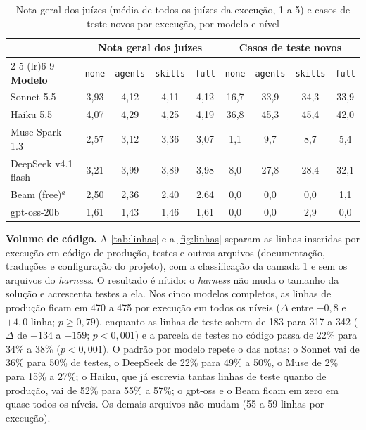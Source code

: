 \begin{table}[htb]
    \centering
    \ABNTEXfontereduzida
    \caption{Nota geral dos juízes (média de todos os juízes da execução, 1 a 5) e casos de teste novos por execução, por modelo e nível}
    \label{tab:qualidade-modelo}
    \begin{tabular}{lcccccccc}
        \toprule
        & \multicolumn{4}{c}{\textbf{Nota geral dos juízes}} & \multicolumn{4}{c}{\textbf{Casos de teste novos}} \\
        \cmidrule(lr){2-5} \cmidrule(lr){6-9}
        \textbf{Modelo} & \texttt{none} & \texttt{agents} & \texttt{skills} & \texttt{full} & \texttt{none} & \texttt{agents} & \texttt{skills} & \texttt{full} \\
        \midrule
        Sonnet 5.5 & 3,93 & 4,12 & 4,11 & 4,12 & 16,7 & 33,9 & 34,3 & 33,9 \\
        Haiku 5.5 & 4,07 & 4,29 & 4,25 & 4,19 & 36,8 & 45,3 & 45,4 & 42,0 \\
        Muse Spark 1.3 & 2,57 & 3,12 & 3,36 & 3,07 & 1,1 & 9,7 & 8,7 & 5,4 \\
        DeepSeek v4.1 flash & 3,21 & 3,99 & 3,89 & 3,98 & 8,0 & 27,8 & 28,4 & 32,1 \\
        Beam (free)$^{a}$ & 2,50 & 2,36 & 2,40 & 2,64 & 0,0 & 0,0 & 0,0 & 1,1 \\
        gpt-oss-20b & 1,61 & 1,43 & 1,46 & 1,61 & 0,0 & 0,0 & 2,9 & 0,0 \\
        \bottomrule
    \end{tabular}
\end{table}

\textbf{Volume de código.} A \autoref{tab:linhas} e a \autoref{fig:linhas}
separam as linhas inseridas por execução em código de produção, testes e outros
arquivos (documentação, traduções e configuração do projeto), com a
classificação da camada 1 e sem os arquivos do \textit{harness}. O resultado é
nítido: o \textit{harness} não muda o tamanho da solução e acrescenta testes a
ela. Nos cinco modelos completos, as linhas de produção ficam em 470 a 475 por
execução em todos os níveis ($\Delta$ entre $-0{,}8$ e $+4{,}0$ linha;
$p \ge 0{,}79$), enquanto as linhas de teste sobem de 183 para 317 a 342
($\Delta$ de $+134$ a $+159$; $p < 0{,}001$) e a parcela de testes no código
passa de 22\% para 34\% a 38\% ($p < 0{,}001$). O padrão por modelo repete o
das notas: o Sonnet vai de 36\% para 50\% de testes, o DeepSeek de 22\% para
49\% a 50\%, o Muse de 2\% para 15\% a 27\%; o Haiku, que já escrevia tantas
linhas de teste quanto de produção, vai de 52\% para 55\% a 57\%; o gpt-oss e o
Beam ficam em zero em quase todos os níveis. Os demais arquivos não mudam (55 a
59 linhas por execução).

